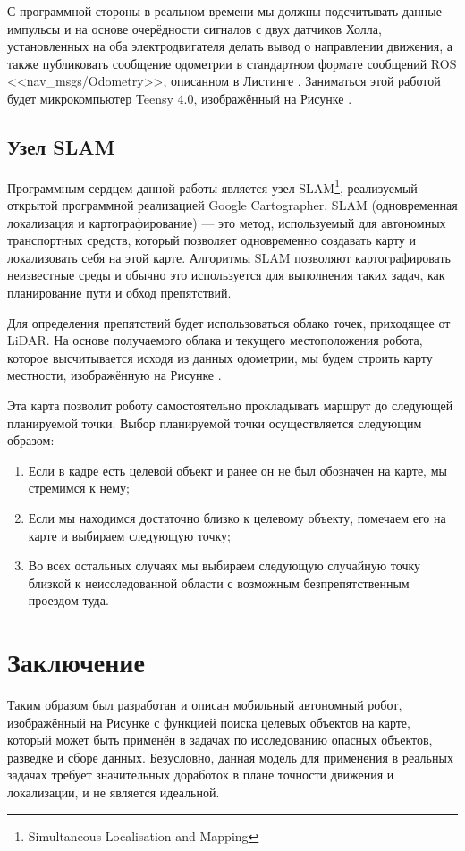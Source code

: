 \documentclass[12pt,a4paper]{scrartcl}
\begin{document}
					С программной стороны в реальном времени мы должны подсчитывать данные импульсы и на основе очерёдности сигналов с двух датчиков Холла, установленных на оба электродвигателя делать вывод о направлении движения, а также публиковать сообщение одометрии в стандартном формате сообщений ROS <<nav\_msgs/Odometry>>, описанном в Листинге . Заниматься этой работой будет микрокомпьютер Teensy 4.0, изображённый на Рисунке  .
					
			\subsection{Узел SLAM} \label{sec:Movement}
				Программным сердцем данной работы является узел SLAM\footnote{Simultaneous Localisation and Mapping}, реализуемый открытой программной реализацией Google Cartographer. SLAM (одновременная локализация и картографирование) — это метод, используемый для автономных транспортных средств, который позволяет одновременно создавать карту и локализовать себя на этой карте. Алгоритмы SLAM позволяют картографировать неизвестные среды и обычно это используется для выполнения таких задач, как планирование пути и обход препятствий.
				
				Для определения препятствий будет использоваться облако точек, приходящее от LiDAR. На основе получаемого облака и текущего местоположения робота, которое высчитывается исходя из данных одометрии, мы будем строить карту местности, изображённую на Рисунке . 
				
				Эта карта позволит роботу самостоятельно прокладывать маршрут до следующей планируемой точки. Выбор планируемой точки осуществляется следующим образом:
				
				\begin{enumerate}
					\item Если в кадре есть целевой объект и ранее он не был обозначен на карте, мы стремимся к нему;
					\item Если мы находимся достаточно близко к целевому объекту, помечаем его на карте и выбираем следующую точку;
					\item Во всех остальных случаях мы выбираем следующую случайную точку близкой к неисследованной области с возможным безпрепятственным проездом туда. 
				\end{enumerate}
					
			\section*{Заключение}
				Таким образом был разработан и описан мобильный автономный робот, изображённый на Рисунке с функцией поиска целевых объектов на карте, который может быть применён в задачах по исследованию опасных объектов, разведке и сборе данных. Безусловно, данная модель для применения в реальных задачах требует значительных доработок в плане точности движения и локализации, и не является идеальной.
					
\end{document}
